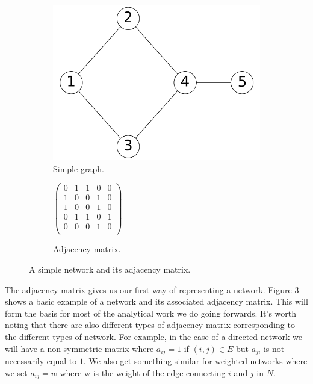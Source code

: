 \begin{figure}
    \begin{center}
        \begin{subfigure}[b]{0.45\textwidth}
            \includegraphics[width=\textwidth]{img/simple_example}
            \caption{Simple graph.}
            \label{fig:simple_network}
        \end{subfigure}
        \begin{subfigure}[b]{0.45\textwidth}
            \begin{center}
            $
            \begin{pmatrix}
                0 & 1 & 1 & 0 & 0 \\
                1 & 0 & 0 & 1 & 0 \\
                1 & 0 & 0 & 1 & 0 \\
                0 & 1 & 1 & 0 & 1 \\
                0 & 0 & 0 & 1 & 0 \\
            \end{pmatrix}
            $
            \end{center}
            \caption{Adjacency matrix.}
            \label{fig:simple_network_adjacency_matrix}
        \end{subfigure}
    \end{center}
    \caption{A simple network and its adjacency matrix.}
    \label{fig:simple_network_and_adjacency_matrix}
\end{figure}

The adjacency matrix gives us our first way of representing a network. Figure \ref{fig:simple_network_and_adjacency_matrix} shows a basic example of a network and its associated adjacency matrix. This will form the basis for most of the analytical work we do going forwards. It's worth noting that there are also different types of adjacency matrix corresponding to the different types of network. For example, in the case of a directed network we will have a non-symmetric matrix where $a_{ij} = 1$ if $(i, j) \in E$ but $a_{ji}$ is not necessarily equal to $1$. We also get something similar for weighted networks where we set $a_{ij} = w$ where w is the weight of the edge connecting $i$ and $j$ in $N$.

